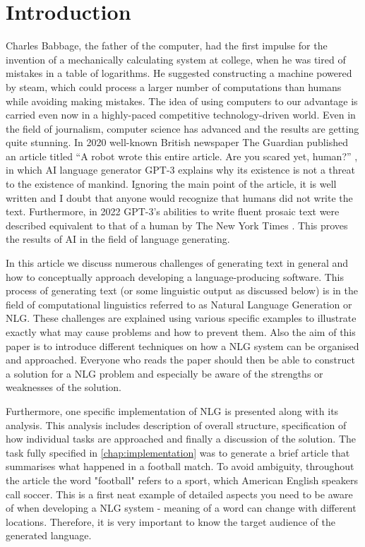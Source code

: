 \chapter*{Introduction}

Charles Babbage, the father of the computer, had the first impulse for the invention of a mechanically calculating system at college, when he was tired of mistakes in a table of logarithms. He suggested constructing a machine powered by steam, which could process a larger number of computations than humans while avoiding making mistakes. The idea of using computers to our advantage is carried even now in a highly-paced competitive technology-driven world. Even in the field of journalism, computer science has advanced and the results are getting quite stunning. In 2020  well-known British newspaper The Guardian published an article titled “A robot wrote this entire article. Are you scared yet, human?” \cite{gpt32020robot}, in which AI language generator GPT-3 explains why its existence is not a threat to the existence of mankind. Ignoring the main point of the article, it is well written and I doubt that anyone would recognize that humans did not write the text. Furthermore, in 2022 GPT-3's abilities to write fluent prosaic text were described equivalent to that of a human by The New York Times \cite{johnson2022ai}. This proves the results of AI in the field of language generating.

In this article we discuss numerous challenges of generating text in general and how to conceptually approach developing a language-producing software. This process of generating text (or some linguistic output as discussed below) is in the field of computational linguistics referred to as Natural Language Generation or NLG. These challenges are explained using various specific examples to illustrate exactly what may cause problems and how to prevent them. Also the aim of this paper is to introduce different techniques on how a NLG system can be organised and approached. Everyone who reads the paper should then be able to construct a solution for a NLG problem and especially be aware of the strengths or weaknesses of the solution.

Furthermore, one specific implementation of NLG is presented along with its analysis. This analysis includes description of overall structure, specification of how individual tasks are approached and finally a discussion of the solution. The task fully specified in \autoref{chap:implementation} was to generate a brief article that summarises what happened in a football match. To avoid ambiguity, throughout the article the word "football" refers to a sport, which American English speakers call soccer. This is a first neat example of detailed aspects you need to be aware of when developing a NLG system - meaning of a word can change with different locations. Therefore, it is very important to know the target audience of the generated language. 




